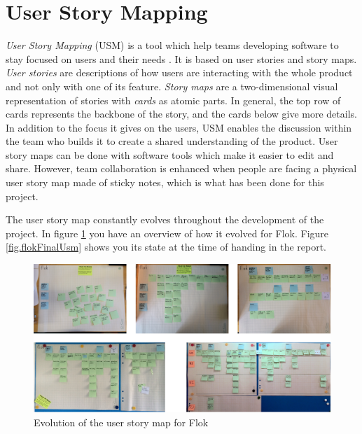\documentclass[a4paper,12pt, oneside]{article}
\begin{document}
\section{User Story Mapping}
\emph{User Story Mapping} (USM) is a tool which help teams developing software to stay focused on users and their needs \cite{patton2014user}.
It is based on user stories and story maps. \emph{User stories} are descriptions of how users are interacting with the whole product and not only with one of its feature. \emph{Story maps} are a two-dimensional visual representation of stories with \emph{cards} as atomic parts.
In general, the top row of cards represents the backbone of the story, and the cards below give more details.
In addition to the focus it gives on the users, USM enables the discussion within the team who builds it to create a shared understanding of the product.
User story maps can be done with software tools which make it easier to edit and share. However, team collaboration is enhanced when people are facing a physical user story map made of sticky notes, which is what has been done for this project.

The user story map constantly evolves throughout the development of the project.
In figure \ref{fig.flokUsmEvolution} you have an overview of how it evolved for Flok.
Figure \ref{fig.flokFinalUsm} shows you its state at the time of handing in the report.

\begin{figure}[!htb]
\centering
\includegraphics[width=\textwidth]{images/flokUsmEvolution.png}
\caption{Evolution of the user story map for Flok}
\label{fig.flokUsmEvolution}
\end{figure}
\end{document}
